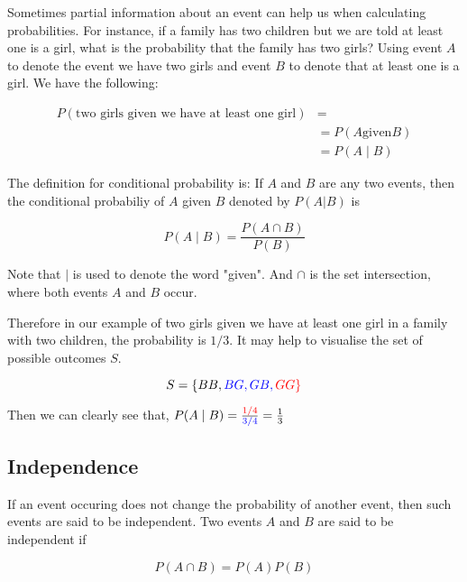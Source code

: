 Sometimes partial information about an event can help us when calculating probabilities. For instance, if a family has two children
but we are told at least one is a girl, what is the probability that the family has two girls? Using event $A$ to denote the event
we have two girls and event $B$ to denote that at least one is a girl. We have the following:

\begin{equation}
\begin{split}
	P(\textrm{two girls given we have at least one girl}) & = \\
	& = P(A \textrm{given} B) \\
	& = P(A\; | \; B)
\end{split}
\end{equation}

The definition for conditional probability is: If $A$ and $B$ are any two events, then the conditional probabiliy of
$A$ given $B$ denoted by $P(A|B)$ is

\begin{equation}
	P(A\; | \; B) = \frac{P(A \cap B)}{P(B)}
\end{equation}

Note that $|$ is used to denote the word "given". And $\cap$ is the set intersection, where both events $A$ and $B$ occur.\newline \par

Therefore in our example of two girls given we have at least one girl in a family with two children, the probability is $1/3$.
It may help to visualise the set of possible outcomes $S$.

\begin{equation}
	S = \left \{BB, \color{blue}BG, GB, \color{red}GG\right \}
\end{equation}

Then we can clearly see that, $P(A\; |\; B) = \frac{\color{red}1/4}{\color{blue}3/4}=\frac{1}{3}$

\subsection{Independence}

If an event occuring does not change the probability of another event, then such events are said to be independent.
Two events $A$ and $B$ are said to be independent if

\begin{equation*}
	P(A\cap B) = P(A)P(B)
\end{equation*}

